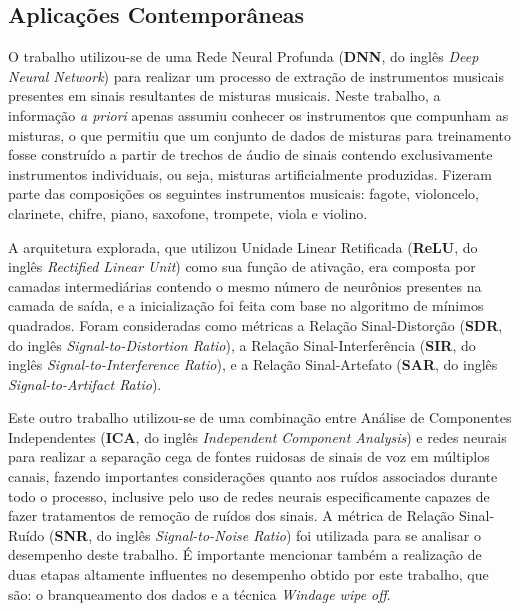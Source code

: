







\subsection{Aplicações Contemporâneas}
\label{subsec:contemp_app}

O trabalho \citep{7178348} utilizou-se de uma Rede Neural Profunda (\textbf{DNN}, do inglês \textit{Deep Neural Network}) para realizar um processo de extração de instrumentos musicais presentes em sinais resultantes de misturas musicais. Neste trabalho, a informação \textit{a priori} apenas assumiu conhecer os instrumentos que compunham as misturas, o que permitiu que um conjunto de dados de misturas para treinamento fosse construído a partir de trechos de áudio de sinais contendo exclusivamente instrumentos individuais, ou seja, misturas artificialmente produzidas. Fizeram parte das composições os seguintes instrumentos musicais: fagote, violoncelo, clarinete, chifre, piano, saxofone, trompete, viola e violino.


A arquitetura explorada, que utilizou Unidade Linear Retificada (\textbf{ReLU}, do inglês \textit{Rectified Linear Unit}) \citep{nair2010rectified} como sua função de ativação, era composta por camadas intermediárias contendo o mesmo número de neurônios presentes na camada de saída, e a inicialização foi feita com base no algoritmo de mínimos quadrados. Foram consideradas como métricas a Relação Sinal-Distorção (\textbf{SDR}, do inglês \textit{Signal-to-Distortion Ratio}), a Relação Sinal-Interferência (\textbf{SIR}, do inglês \textit{Signal-to-Interference Ratio}), e a Relação Sinal-Artefato (\textbf{SAR}, do inglês \textit{Signal-to-Artifact Ratio}).


Este outro trabalho \citep{6245800} utilizou-se de uma combinação entre Análise de Componentes Independentes (\textbf{ICA}, do inglês \textit{Independent Component Analysis}) e redes neurais para realizar a separação cega de fontes ruidosas de sinais de voz em múltiplos canais, fazendo importantes considerações quanto aos ruídos associados durante todo o processo, inclusive pelo uso de redes neurais especificamente capazes de fazer tratamentos de remoção de ruídos dos sinais. A métrica de Relação Sinal-Ruído (\textbf{SNR}, do inglês \textit{Signal-to-Noise Ratio}) foi utilizada para se analisar o desempenho deste trabalho. É importante mencionar também a realização de duas etapas altamente influentes no desempenho obtido por este trabalho, que são: o branqueamento dos dados e a técnica \textit{Windage wipe off}.


